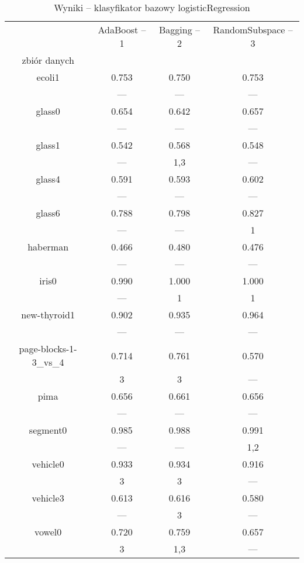 \documentclass[a4paper,12pt]{article}
\begin{document}
\newpage
\begin{table}[H]
    \begin{center}
    \caption{Wyniki -- klasyfikator bazowy logisticRegression}
    \label{tab:resultsLR}
    \begin{tabular}{|c|c|c|c|}
    \hline
    & AdaBoost -- 1 & Bagging -- 2 & RandomSubspace -- 3 \\
    zbiór danych & & &\\
    \hline
    \hline
    ecoli1 & 0.753 & 0.750 & 0.753 \\
	& --- & --- & --- \\
    \hline
    glass0 & 0.654 & 0.642 & 0.657 \\
	& --- & --- & --- \\
    \hline
    glass1 & 0.542 & 0.568 & 0.548 \\
	& --- & 1,3 & --- \\
    \hline
    glass4 & 0.591 & 0.593 & 0.602 \\
	& --- & --- & --- \\
    \hline
    glass6 & 0.788 & 0.798 & 0.827\\
	& --- & --- & 1 \\
    \hline
    haberman & 0.466 & 0.480 &  0.476\\
	& --- & --- & --- \\
    \hline
    iris0  & 0.990 & 1.000 & 1.000 \\
	& --- & 1 & 1 \\
    \hline
    new-thyroid1 & 0.902 & 0.935 & 0.964 \\
	& --- & --- & --- \\
    \hline
    page-blocks-1-3\_vs\_4 & 0.714 & 0.761 & 0.570  \\
	& 3 & 3 & --- \\
    \hline
    pima & 0.656 & 0.661 & 0.656 \\
	& --- & --- & --- \\
    \hline
    segment0 & 0.985 & 0.988 & 0.991 \\
	& --- & --- & 1,2 \\
    \hline
    vehicle0 & 0.933 & 0.934 & 0.916 \\
	& 3 & 3 & --- \\
    \hline
    vehicle3 & 0.613 & 0.616 & 0.580\\
	& --- & 3 & --- \\
    \hline
    vowel0 & 0.720 & 0.759 & 0.657 \\
	& 3 & 1,3 & --- \\
    \hline

\end{tabular}
\end{center}
\end{table}
\end{document}
